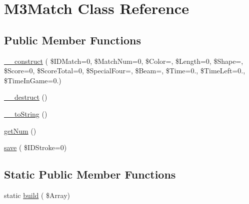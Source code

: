 \hypertarget{class_m3_match}{}\section{M3\+Match Class Reference}
\label{class_m3_match}
\subsection*{Public Member Functions}
\begin{DoxyCompactItemize}
\item 
\hyperlink{class_m3_match_a06f9baa07b235b5607b2376c2ef7726b}{\+\_\+\+\_\+construct} ( \$I\+D\+Match=0, \$Match\+Num=0, \$Color=\textquotesingle{}\textquotesingle{}, \$Length=0, \$Shape=\textquotesingle{}\textquotesingle{}, \$Score=0, \$Score\+Total=0, \$Special\+Four=\textquotesingle{}\textquotesingle{}, \$Beam=\textquotesingle{}\textquotesingle{}, \$Time=0., \$Time\+Left=0., \$Time\+In\+Game=0.)
\item 
\hyperlink{class_m3_match_a993e96aa98947a76c944aa112667673d}{\+\_\+\+\_\+destruct} ()
\item 
\hyperlink{class_m3_match_a078e2fcc74c49a28d149b3659363dc78}{\+\_\+\+\_\+to\+String} ()
\item 
\hyperlink{class_m3_match_a05b5ca86c54022cb8b9c7a0e53bf16ae}{get\+Num} ()
\item 
\hyperlink{class_m3_match_a999157933b67a6f6615ea58a1c7d1677}{save} ( \$I\+D\+Stroke=0)
\end{DoxyCompactItemize}
\subsection*{Static Public Member Functions}
\begin{DoxyCompactItemize}
\item 
static \hyperlink{class_m3_match_a06b58fe50392d408a41c04c66dcd20fa}{build} ( \$Array)
\end{DoxyCompactItemize}
